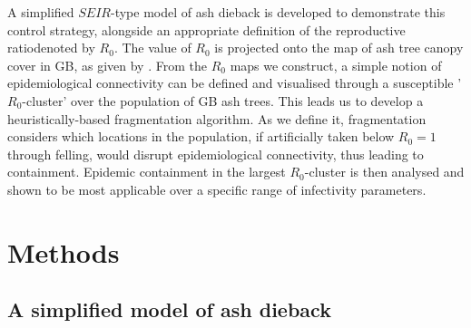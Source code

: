A simplified $SEIR$-type model of ash dieback is developed to demonstrate this control strategy, alongside an appropriate definition of the reproductive ratio\textemdash denoted by $R_0$.  The value of $R_0$ is projected onto the map of ash tree canopy cover in GB, as given by \cite{hill.data}. From the $R_0$ maps we construct, a simple notion of epidemiological connectivity can be defined and visualised through a susceptible '$R_0$-cluster' over the population of GB ash trees. This leads us to develop a heuristically-based fragmentation algorithm. As we define it, fragmentation considers which locations in the population, if artificially taken below $R_0 = 1$ through felling, would disrupt epidemiological connectivity\textemdash, thus leading to containment. Epidemic containment in the largest $R_0$-cluster is then analysed and shown to be most applicable over a specific range of infectivity parameters.

\section{Methods}

\subsection{A simplified model of ash dieback}


